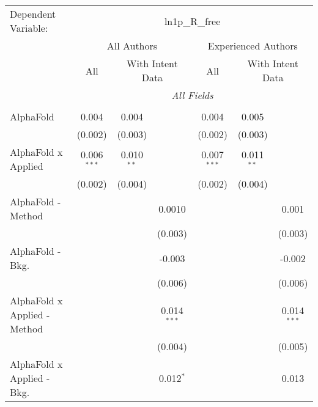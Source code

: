 \begingroup
\centering
\begin{tabular}{lcccccc}
   \tabularnewline \midrule \midrule
   Dependent Variable: & \multicolumn{6}{c}{ln1p\_R\_free}\\
 & \multicolumn{3}{c}{All Authors} & \multicolumn{3}{c}{Experienced Authors} \\
\cmidrule(lr){2-4} \cmidrule(lr){5-7}
 & \multicolumn{1}{c}{All} & \multicolumn{2}{c}{With Intent Data} & \multicolumn{1}{c}{All} & \multicolumn{2}{c}{With Intent Data} \\
\cmidrule(lr){2-2} \cmidrule(lr){3-4} \cmidrule(lr){5-5} \cmidrule(lr){6-7}
 & \multicolumn{6}{c}{\textit{All Fields}} \\ \\
   AlphaFold                      & 0.004          & 0.004          &               & 0.004          & 0.005          &   \\   
                                  & (0.002)        & (0.003)        &               & (0.002)        & (0.003)        &   \\   
   AlphaFold x Applied            & 0.006$^{***}$  & 0.010$^{**}$   &               & 0.007$^{***}$  & 0.011$^{**}$   &   \\   
                                  & (0.002)        & (0.004)        &               & (0.002)        & (0.004)        &   \\   
   AlphaFold - Method             &                &                & 0.0010        &                &                & 0.001\\   
                                  &                &                & (0.003)       &                &                & (0.003)\\   
   AlphaFold - Bkg.               &                &                & -0.003        &                &                & -0.002\\   
                                  &                &                & (0.006)       &                &                & (0.006)\\   
   AlphaFold x Applied - Method   &                &                & 0.014$^{***}$ &                &                & 0.014$^{***}$\\   
                                  &                &                & (0.004)       &                &                & (0.005)\\   
   AlphaFold x Applied - Bkg.     &                &                & 0.012$^{*}$   &                &                & 0.013\\   

\end{tabular}

